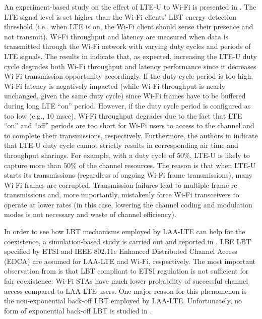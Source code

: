 \documentclass[12pt,onecolumn]{article}
\begin{document}
An experiment-based study on the effect of LTE-U to Wi-Fi is presented in \cite{LTE-U-CableLabs}. The LTE signal level is set higher than the Wi-Fi clients' LBT energy detection threshold (i.e., when LTE is on, the Wi-Fi client should sense their presence and not transmit). Wi-Fi throughput and latency are measured when data is transmitted through the Wi-Fi network with varying duty cycles and periods of LTE signals. The results in \cite{LTE-U-CableLabs} indicate that, as expected, increasing the LTE-U duty cycle degrades both Wi-Fi throughput and latency performance since it decreases Wi-Fi transmission opportunity accordingly. If the duty cycle period is too high, Wi-Fi latency is negatively impacted (while Wi-Fi throughput is nearly unchanged, given the same duty cycle) since Wi-Fi frames have to be buffered during long LTE ``on'' period. However, if the duty cycle period is configured as too low (e.g., $10$ msec), Wi-Fi throughput degrades due to the fact that LTE ``on'' and ``off'' periods are too short for Wi-Fi users to access to the channel and to complete their transmissions, respectively. Furthermore, the authors in \cite{LTE-U-CableLabs} indicate that LTE-U duty cycle cannot strictly results in corresponding air time and throughput sharings. For example, with a duty cycle of $50$\%, LTE-U is likely to capture more than $50$\% of the channel resources. The reason is that when LTE-U starts its transmissions (regardless of ongoing Wi-Fi frame transmissions), many Wi-Fi frames are corrupted. Transmission failures lead to multiple frame re-transmissions and, more importantly, mistakenly force Wi-Fi transceivers to operate at lower rates (in this case, lowering the channel coding and modulation modes is not necessary and waste of channel efficiency).

In order to see how LBT mechanisms employed by LAA-LTE can help for the coexistence, a simulation-based study is carried out and reported in \cite{LBT-CableLabs-2014}. LBE LBT specified by ETSI \cite{LBT-ETSI-2014} and IEEE 802.11e Enhanced Distributed Channel Access (EDCA) are assumed for LAA-LTE and Wi-Fi, respectively. The most important observation from \cite{LBT-CableLabs-2014} is that LBT compliant to ETSI regulation is not sufficient for fair coexistence: Wi-Fi STAs have much lower probability of successful channel access compared to LAA-LTE users. One major reason for this phenomenon is the non-exponential back-off LBT employed by LAA-LTE. Unfortunately, no form of exponential back-off LBT is studied in \cite{LBT-CableLabs-2014}.
\end{document}
